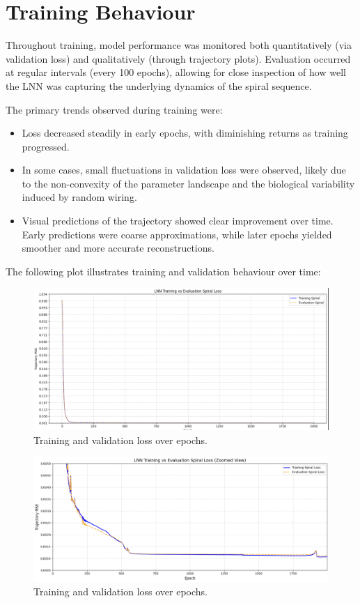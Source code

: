 \section{Training Behaviour}
Throughout training, model performance was monitored both quantitatively (via validation loss) and qualitatively (through trajectory plots). Evaluation occurred at regular intervals (every 100 epochs), allowing for close inspection of how well the LNN was capturing the underlying dynamics of the spiral sequence.

\noindent The primary trends observed during training were:
\begin{itemize}
    \item Loss decreased steadily in early epochs, with diminishing returns as training progressed.
    \item In some cases, small fluctuations in validation loss were observed, likely due to the non-convexity of the parameter landscape and the biological variability induced by random wiring.
    \item Visual predictions of the trajectory showed clear improvement over time. Early predictions were coarse approximations, while later epochs yielded smoother and more accurate reconstructions.
\end{itemize}


\noindent The following plot illustrates training and validation behaviour over time:

\begin{figure}[H]
    \centering
    \includegraphics[width=0.8\linewidth]{img/lnn_loss_curve.png}
    \caption{Training and validation loss over epochs.}
    \label{fig:lnn_loss}
\end{figure}

\begin{figure}[H]
    \centering
    \includegraphics[width=0.8\linewidth]{img/lnn_loss_curve_zoomed.png}
    \caption{Training and validation loss over epochs.}
    \label{fig:lnn_loss_zoomed}
\end{figure}

